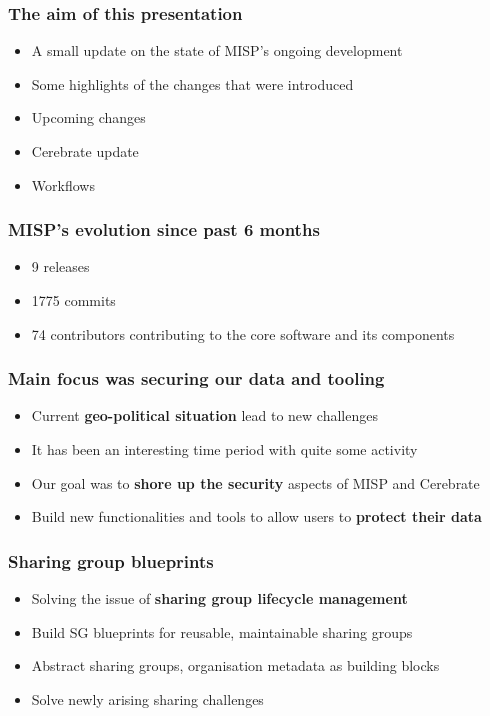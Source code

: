 
\begin{frame}
\titlepage
\end{frame}

\begin{frame}
  \frametitle{The aim of this presentation}
  \begin{itemize}
     \item A small update on the state of MISP's ongoing development
     \item Some highlights of the changes that were introduced
     \item Upcoming changes
     \item Cerebrate update
     \item Workflows
  \end{itemize}
\end{frame}

\begin{frame}
  \frametitle{MISP's evolution since past 6 months}
  \begin{itemize}
    \item 9 releases
    \item 1775 commits
    \item 74 contributors contributing to the core software and its components
  \end{itemize}
\end{frame}

\begin{frame}
  \frametitle{Main focus was securing our data and tooling}
  \begin{itemize}
      \item Current {\bf geo-political situation} lead to new challenges
      \item It has been an interesting time period with quite some activity
      \item Our goal was to {\bf shore up the security} aspects of MISP and Cerebrate
      \item Build new functionalities and tools to allow users to {\bf protect their data}
  \end{itemize}
\end{frame}

\begin{frame}
  \frametitle{Sharing group blueprints}
  \begin{itemize}
     \item Solving the issue of {\bf sharing group lifecycle management}
     \item Build SG blueprints for reusable, maintainable sharing groups
     \item Abstract sharing groups, organisation metadata as building blocks
     \item Solve newly arising sharing challenges
  \end{itemize}
\end{frame}

